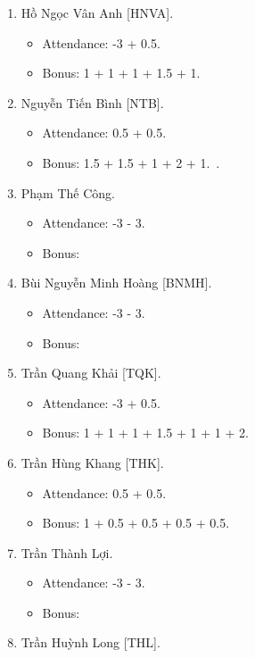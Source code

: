 \documentclass{article}
\begin{document}
\begin{enumerate}
    \item {\sc Hồ Ngọc Vân Anh [HNVA].}
    \begin{itemize}
        \item Attendance: -3 + 0.5.
        \item Bonus: 1 + 1 + 1 + 1.5 + 1.
    \end{itemize}
    \item {\sc Nguyễn Tiến Bình [NTB].}
    \begin{itemize}
        \item Attendance: 0.5 + 0.5.
        \item Bonus: 1.5 + 1.5 + 1 + 2 + 1. .
    \end{itemize}
    \item {\sc Phạm Thế Công.}
    \begin{itemize}
        \item Attendance: -3 - 3.
        \item Bonus:
    \end{itemize}
    \item {\sc Bùi Nguyễn Minh Hoàng [BNMH].}
    \begin{itemize}
        \item Attendance: -3 - 3.
        \item Bonus:
    \end{itemize}
    \item {\sc Trần Quang Khải [TQK].}
    \begin{itemize}
        \item Attendance: -3 + 0.5.
        \item Bonus: 1 + 1 + 1 + 1.5 + 1 + 1 + 2.
    \end{itemize}
    \item {\sc Trần Hùng Khang [THK].}
    \begin{itemize}
        \item Attendance: 0.5 + 0.5.
        \item Bonus: 1 + 0.5 + 0.5 + 0.5 + 0.5.
    \end{itemize}
    \item {\sc Trần Thành Lợi.}
    \begin{itemize}
        \item Attendance: -3 - 3.
        \item Bonus:
    \end{itemize}
    \item {\sc Trần Huỳnh Long [THL].}
    \begin{itemize}

\end{itemize}
\end{enumerate}
\end{document}
